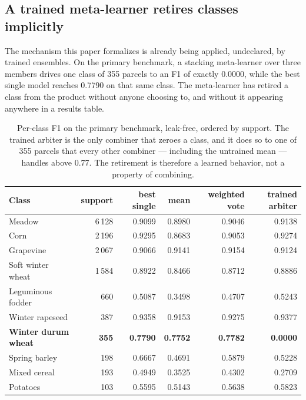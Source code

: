 \subsection{A trained meta-learner retires classes implicitly}
\label{sec:arbiter}

The mechanism this paper formalizes is already being applied, undeclared, by trained ensembles. On
the primary benchmark, a stacking meta-learner over three members drives one class of \num{355}
parcels to an F1 of exactly \num{0.0000}, while the best single model reaches \num{0.7790} on that
same class. The meta-learner has retired a class from the product without anyone choosing to, and
without it appearing anywhere in a results table.

\begin{table}[tbp]
\caption{Per-class F1 on the primary benchmark, leak-free, ordered by support. The trained
arbiter is the only combiner that zeroes a class, and it does so to one of \num{355} parcels that
every other combiner --- including the untrained mean --- handles above \num{0.77}. The retirement
is therefore a learned behavior, not a property of combining.}
\label{tab:perclass}
\centering
\small
\begin{tabular}{lrrrrr}
\toprule
Class & support & best single & mean & weighted vote & trained arbiter \\
\midrule
Meadow & 6\,128 & 0.9099 & 0.8980 & 0.9046 & 0.9138 \\
Corn & 2\,196 & 0.9295 & 0.8683 & 0.9053 & 0.9274 \\
Grapevine & 2\,067 & 0.9066 & 0.9141 & 0.9154 & 0.9124 \\
Soft winter wheat & 1\,584 & 0.8922 & 0.8466 & 0.8712 & 0.8886 \\
Leguminous fodder & 660 & 0.5087 & 0.3498 & 0.4707 & 0.5243 \\
Winter rapeseed & 387 & 0.9358 & 0.9153 & 0.9275 & 0.9377 \\
\textbf{Winter durum wheat} & \textbf{355} & \textbf{0.7790} & \textbf{0.7752} & \textbf{0.7782} & \textbf{0.0000} \\
Spring barley & 198 & 0.6667 & 0.4691 & 0.5879 & 0.5228 \\
Mixed cereal & 193 & 0.4949 & 0.3525 & 0.4302 & 0.2709 \\
Potatoes & 103 & 0.5595 & 0.5143 & 0.5638 & 0.5823 \\
\bottomrule
\end{tabular}
\end{table}

